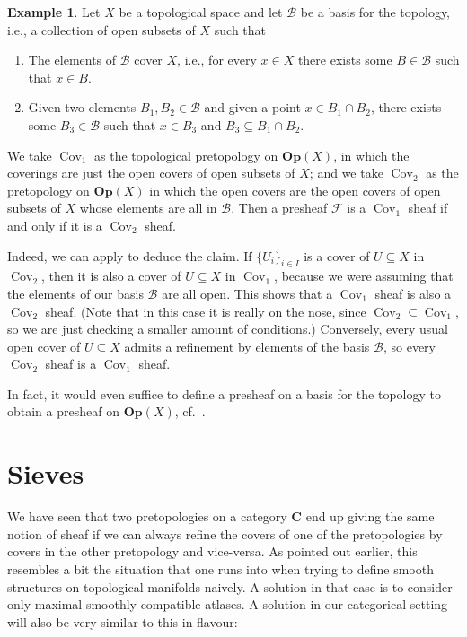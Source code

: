 \documentclass[12pt,reqno,a4paper]{amsart}
\theoremstyle{plain}
\theoremstyle{definition}
\newtheorem{exmp}[thm]{Example}
\theoremstyle{remark}
\begin{document}
\begin{exmp}
  Let $X$ be a topological space and let $\mathcal{B}$ be a basis for the topology, i.e., a collection of open subsets of $X$ such that
  \begin{enumerate}
    \item The elements of $\mathcal{B}$ cover $X$, i.e., for every $x \in X$ there exists some $B \in \mathcal{B}$ such that $x \in B$.
    \item Given two elements $B_{1}, B_{2} \in \mathcal{B}$ and given a point $x \in B_{1} \cap B_{2}$, there exists some $B_{3} \in \mathcal{B}$ such that $x \in B_{3}$ and $B_{3} \subseteq B_{1} \cap B_{2}$.
  \end{enumerate}
  We take $\operatorname{Cov}_{1}$ as the topological pretopology on $\mathbf{Op}(X)$, in which the coverings are just the open covers of open subsets of $X$; and we take $\operatorname{Cov}_{2}$ as the pretopology on $\mathbf{Op}(X)$ in which the open covers are the open covers of open subsets of $X$ whose elements are all in $\mathcal{B}$.
  Then a presheaf $\mathscr{F}$ is a $\operatorname{Cov}_{1}$ sheaf if and only if it is a $\operatorname{Cov}_{2}$ sheaf.
  
  Indeed, we can apply  to deduce the claim.
  If $\{ U_{i} \}_{i \in I}$ is a cover of $U\subseteq X$ in $\operatorname{Cov}_{2}$, then it is also a cover of $U\subseteq X$ in $\operatorname{Cov}_{1}$, because we were assuming that the elements of our basis $\mathcal{B}$ are all open.
  This shows that a $\operatorname{Cov}_{1}$ sheaf is also a $\operatorname{Cov}_{2}$ sheaf.
  (Note that in this case it is really on the nose, since $\operatorname{Cov}_{2} \subseteq \operatorname{Cov}_{1}$, so we are just checking a smaller amount of conditions.)
  Conversely, every usual open cover of $U \subseteq X$ admits a refinement by elements of the basis $\mathcal{B}$, so every $\operatorname{Cov}_{2}$ sheaf is a $\operatorname{Cov}_{1}$ sheaf.
\end{exmp}

In fact, it would even suffice to define a presheaf on a basis for the topology to obtain a presheaf on $\mathbf{Op}(X)$, cf.~\cite[Chapter 0, (3.2.1)]{ega}.

\section{Sieves}

We have seen that two pretopologies on a category $\mathbf{C}$ end up giving the same notion of sheaf if we can always refine the covers of one of the pretopologies by covers in the other pretopology and vice-versa.
As pointed out earlier, this resembles a bit the situation that one runs into when trying to define smooth structures on topological manifolds naively.
A solution in that case is to consider only maximal smoothly compatible atlases.
A solution in our categorical setting will also be very similar to this in flavour:
\end{document}
